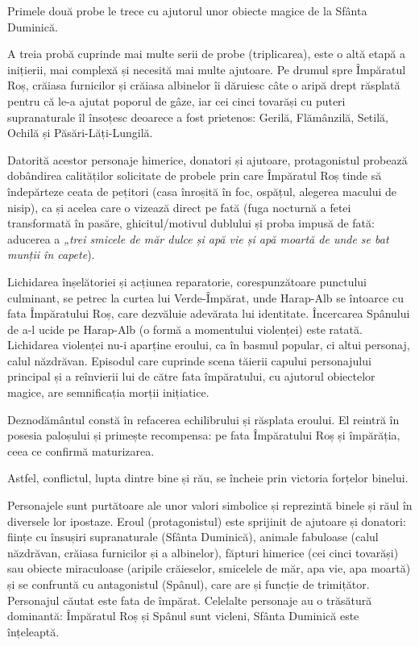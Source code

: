 Primele două probe le trece cu ajutorul unor obiecte magice de la Sfânta Duminică.

A treia probă cuprinde mai multe serii de probe (triplicarea), este o altă etapă a inițierii, mai complexă și necesită mai multe ajutoare. Pe drumul spre Împăratul Roș, crăiasa furnicilor și crăiasa albinelor îi dăruiesc câte o aripă drept răsplată pentru că le-a ajutat poporul de gâze, iar cei cinci tovarăși cu puteri supranaturale îl însoțesc deoarece a fost prietenos: Gerilă, Flămânzilă, Setilă, Ochilă și Păsări-Lăți-Lungilă.

Datorită acestor personaje himerice, donatori și ajutoare, protagonistul probează dobândirea calităților solicitate de probele prin care Împăratul Roș tinde să îndepărteze ceata de pețitori (casa înroșită în foc, ospățul, alegerea macului de nisip), ca și acelea care o vizează direct pe fată (fuga nocturnă a fetei transformată în pasăre, ghicitul/motivul dublului și proba impusă de fată: aducerea a \textit{„trei smicele de măr dulce și apă vie și apă moartă de unde se bat munții în capete}).

Lichidarea înșelătoriei și acțiunea reparatorie, corespunzătoare punctului culminant, se petrec la curtea lui Verde-Împărat, unde Harap-Alb se întoarce cu fata Împăratului Roș, care dezvăluie adevărata lui identitate. Încercarea Spânului de a-l ucide pe Harap-Alb (o formă a momentului violenței) este ratată. Lichidarea violenței nu-i aparține eroului, ca în basmul popular, ci altui personaj, calul năzdrăvan. Episodul care cuprinde scena tăierii capului personajului principal și a reînvierii lui de către fata împăratului, cu ajutorul obiectelor magice, are semnificația morții inițiatice.

Deznodământul constă în refacerea echilibrului și răsplata eroului. El reintră în posesia paloșului și primește recompensa: pe fata Împăratului Roș și împărăția, ceea ce confirmă maturizarea.

Astfel, conflictul, lupta dintre bine și rău, se încheie prin victoria forțelor binelui.

Personajele sunt purtătoare ale unor valori simbolice și reprezintă binele și răul în diversele lor ipostaze. Eroul (protagonistul) este sprijinit de ajutoare și donatori: ființe cu însușiri supranaturale (Sfânta Duminică), animale fabuloase (calul năzdrăvan, crăiasa furnicilor și a albinelor), făpturi himerice (cei cinci tovarăși) sau obiecte miraculoase (aripile crăieselor, smicelele de măr, apa vie, apa moartă) și se confruntă cu antagonistul (Spânul), care are și funcție de trimițător. Personajul căutat este fata de împărat. Celelalte personaje au o trăsătură dominantă: Împăratul Roș și Spânul sunt vicleni, Sfânta Duminică este înțeleaptă.

